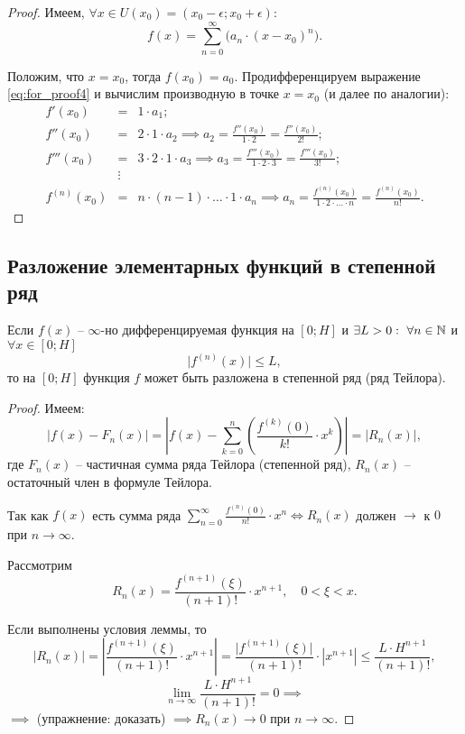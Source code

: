 \begin{proof}
    Имеем, $\forall x \in U(x_0) = (x_0 - \epsilon;x_0 + \epsilon)$:
    \begin{equation}\label{eq:for_proof4}
        f(x) = \sum_{n=0}^{\infty}\big(a_n\cdot (x-x_0)^n\big).
    \end{equation}

    Положим, что $x=x_0$, тогда $f(x_0) = a_0$. Продифференцируем выражение \ref{eq:for_proof4} и вычислим производную в точке $x=x_0$ (и далее по аналогии):
    \begin{eqnarray*}
        f'(x_0) &=& 1 \cdot a_1; \\
        f''(x_0) &=& 2 \cdot 1 \cdot a_2 \implies a_2 = \frac{f''(x_0)}{1 \cdot 2} = \frac{f''(x_0)}{2!}; \\
        f'''(x_0) &=& 3 \cdot 2 \cdot 1 \cdot a_3 \implies a_3 = \frac{f'''(x_0)}{1 \cdot 2 \cdot 3} = \frac{f'''(x_0)}{3!}; \\
        &\vdots& \\
        f^{(n)}(x_0) &=& n \cdot (n-1) \cdot \ldots \cdot 1 \cdot a_n \implies a_n = \frac{f^{(n)}(x_0)}{1 \cdot 2 \cdot \ldots \cdot n} = \frac{f^{(n)}(x_0)}{n!}.
    \end{eqnarray*}
\end{proof}

\subsection{Разложение элементарных функций в степенной ряд}

\begin{lemma}
    Если $f(x)$ -- $\infty$-но дифференцируемая функция на $[0;H]$ и $\exists L > 0: \ \forall n \in \mathbb{N}$ и $\forall x \in [0;H]$
    \[
        \big|f^{(n)}(x)\big| \leqslant L,
    \]
    то на $[0;H]$ функция $f$ может быть разложена в степенной ряд (ряд Тейлора).
\end{lemma}

\begin{proof}
    Имеем:
    \[
        \big|f(x) - F_n(x)\big| = \left|f(x) - \sum_{k=0}^{n}\left(\frac{f^{(k)}(0)}{k!}\cdot x^k\right)\right| = \big|R_n(x)\big|,
    \]
    где $ F_n(x) $ -- частичная сумма ряда Тейлора (степенной ряд), $ R_n(x) $ -- остаточный член в формуле Тейлора.

    Так как $f(x)$ есть сумма ряда $\sum_{n=0}^{\infty}\frac{f^{(n)}(0)}{n!}\cdot x^n \iff R_n(x)$ должен $\rightarrow$ к $0$ при $n\rightarrow\infty$.

    Рассмотрим
    \[
        R_n(x) = \frac{f^{(n+1)}(\xi)}{(n+1)!} \cdot x^{n+1}, \quad 0 < \xi < x.
    \]

    Если выполнены условия леммы, то
    \[
        \big|R_n(x)\big| = \left|\frac{f^{(n+1)}(\xi)}{(n+1)!} \cdot x^{n+1}\right| = \frac{\big|f^{(n+1)}(\xi)\big|}{(n+1)!} \cdot |x^{n+1}| \leqslant \frac{L \cdot H^{n+1}}{(n+1)!},
    \]
    \[
        \underset{n\rightarrow\infty}{\lim}\frac{L\cdot H^{n+1}}{(n+1)!} = 0 \implies
    \]
    $ \implies $ (упражнение: доказать) $\implies R_n(x) \rightarrow 0$ при $n \rightarrow\infty$.
\end{proof}